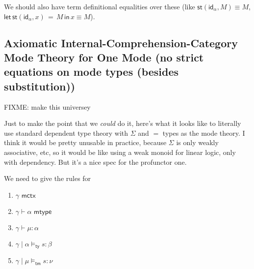 \documentclass[10pt]{article}
\newcommand{\yields}{\vdash}
\newcommand{\ctx}{\,\,\mathsf{mctx}}
\newcommand{\type}{\,\,\mathsf{mtype}}
\newcommand\St[2]{\ensuremath{{#1}(#2)}}
\newcommand\StI[2]{\ensuremath{\mathsf{st}(#1,#2)}}
\newcommand\StE[4]{\ensuremath{\mathsf{let} \, \StI{#2}{#3} \, = \, {#1} \, \mathsf{in} \, #4}}
\newcommand\TypeTwo[4]{\ensuremath{#1 \mid #3 \vDash_\mathsf{ty} #2 : #4}}
\newcommand\TermTwo[4]{\ensuremath{#1 \mid #3 \vDash_\mathsf{tm} #2 : #4}}
\newcommand{\id}{\mathsf{id}}
\begin{document}
We should also have term definitional equalities over these (like
$\StI{\id_\alpha}{M} \equiv M$, $\StE{M}{\id_\alpha}{x}{x} \equiv M$).
%

\subsection{Axiomatic Internal-Comprehension-Category Mode Theory for
  One Mode (no strict equations on mode types (besides substitution))}

FIXME: make this universey

Just to make the point that we \emph{could} do it, here's what it looks
like to literally use standard dependent type theory with $\Sigma$ and
$=$ types as the mode theory.  I think it would be pretty unusable in
practice, because $\Sigma$ is only weakly associative, etc, so it would
be like using a weak monoid for linear logic, only with dependency.      
But it's a nice spec for the profunctor one.  

We need to give the rules for
\begin{enumerate}
\item $\gamma \ctx$ 
\item $\gamma \yields \alpha \type$ 
\item $\gamma \yields \mu : \alpha$ 
\item $\TypeTwo{\gamma}{s}{\alpha}{\beta}$ 
\item $\TermTwo{\gamma}{s}{\mu}{\nu}$ 
\end{enumerate}
\end{document}

